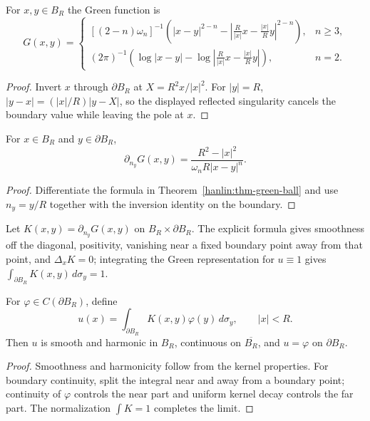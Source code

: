 \begin{theorem}\label{hanlin:thm-green-ball}
For $x,y\in B_R$ the Green function is
\[
G(x,y)=\begin{cases}
[(2-n)\omega_n]^{-1}\left(|x-y|^{2-n}-\left|\frac R{|x|}x-\frac{|x|}{R}y\right|^{2-n}\right),&n\ge3,\\
(2\pi)^{-1}\left(\log|x-y|-\log\left|\frac R{|x|}x-\frac{|x|}{R}y\right|\right),&n=2.
\end{cases}
\]
\end{theorem}
\begin{proof}
\sketch Invert $x$ through $\partial B_R$ at $X=R^2x/|x|^2$. For $|y|=R$,
$|y-x|=(|x|/R)|y-X|$, so the displayed reflected singularity cancels the
boundary value while leaving the pole at $x$.
\end{proof}

\begin{corollary}\label{hanlin:cor-green-normal-derivative}
For $x\in B_R$ and $y\in\partial B_R$,
\[
\partial_{n_y}G(x,y)=\frac{R^2-|x|^2}{\omega_nR|x-y|^n}.
\]
\end{corollary}
\begin{proof}
\sketch Differentiate the formula in Theorem~\ref{hanlin:thm-green-ball} and use
$n_y=y/R$ together with the inversion identity on the boundary.
\end{proof}

Let $K(x,y)=\partial_{n_y}G(x,y)$ on $B_R\times\partial B_R$. The explicit
formula gives smoothness off the diagonal, positivity, vanishing near a fixed
boundary point away from that point, and $\Delta_xK=0$; integrating the Green
representation for $u\equiv1$ gives $\int_{\partial B_R}K(x,y)\,d\sigma_y=1$.

\begin{theorem}\label{hanlin:thm-poisson-dirichlet}
For $\varphi\in C(\partial B_R)$, define
\[
u(x)=\int_{\partial B_R}K(x,y)\varphi(y)\,d\sigma_y,\qquad |x|<R.
\]
Then $u$ is smooth and harmonic in $B_R$, continuous on $\overline{B_R}$, and
$u=\varphi$ on $\partial B_R$.
\end{theorem}
\begin{proof}
\sketch Smoothness and harmonicity follow from the kernel properties. For
boundary continuity, split the integral near and away from a boundary point;
continuity of $\varphi$ controls the near part and uniform kernel decay controls
the far part. The normalization $\int K=1$ completes the limit.
\end{proof}

